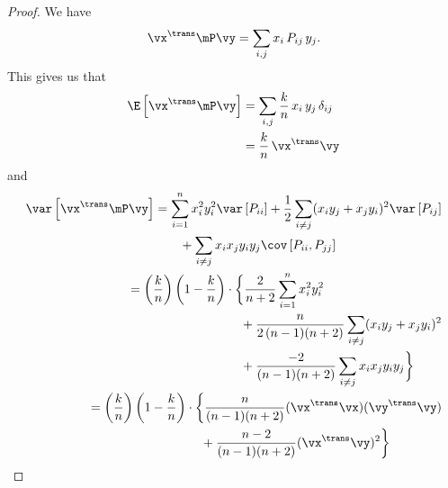 \begin{proof}
    We have
    \[
        \vx^\trans \mP \vy
            = \sum_{i,j} x_i \, P_{ij} \, y_j.
    \]
    This gives us that
    \begin{align*}
        \E \left[ \vx^\trans \mP \vy \right]
            &= \sum_{i,j} \frac{k}{n} \, x_i \, y_j \, \delta_{ij} \\
            &= \frac{k}{n} \, \vx^\trans \vy
    \end{align*}
    and
    \begin{align*}
        \begin{split}
        \var \left[ \vx^\trans \mP \vy \right]
            &= 
               \sum_{i=1}^n
                    x_i^2 y_i^2 \var \left[ P_{ii} \right]
               +
               \frac{1}{2}
               \sum_{i \neq j} 
                    (x_i y_j + x_j y_i)^2 
                    \var \left[ P_{ij} \right] \\
            &\qquad+
               \sum_{i \neq j}
                    x_i x_j y_i y_j
                    \cov \left[ P_{ii}, P_{jj} \right]
        \end{split} \\
        \begin{split}
            &=
                \left( \frac{k}{n} \right)
                \left( 1 - \frac{k}{n} \right)
                \cdot \bigg\{
                    \frac{2}{n+2}
                    \sum_{i=1}^n x_i^2 y_i^2 \\
            &\qquad\qquad\qquad\qquad\quad+
                \frac{n}{ 2 \, (n-1) (n+2) }
                \sum_{i\neq j} (x_i y_j + x_j y_i)^2 \\
            &\qquad\qquad\qquad\qquad\quad+
                \frac{-2}{ (n-1) (n+2) }
                \sum_{i \neq j} x_i x_j y_i y_j \bigg\}
        \end{split} \\
        \begin{split}
            &=
                \left( \frac{k}{n} \right)
                \left( 1 - \frac{k}{n} \right)
                \cdot \bigg\{
                    \frac{n}{ (n-1) (n+2) } 
                    ( \vx^\trans \vx )( \vy^\trans \vy ) \\
            &\qquad\qquad\qquad\qquad\quad+
                \frac{n-2}{ (n-1) (n+2) } ( \vx^\trans \vy )^2 \bigg\}
        \end{split}
    \end{align*}
\end{proof}